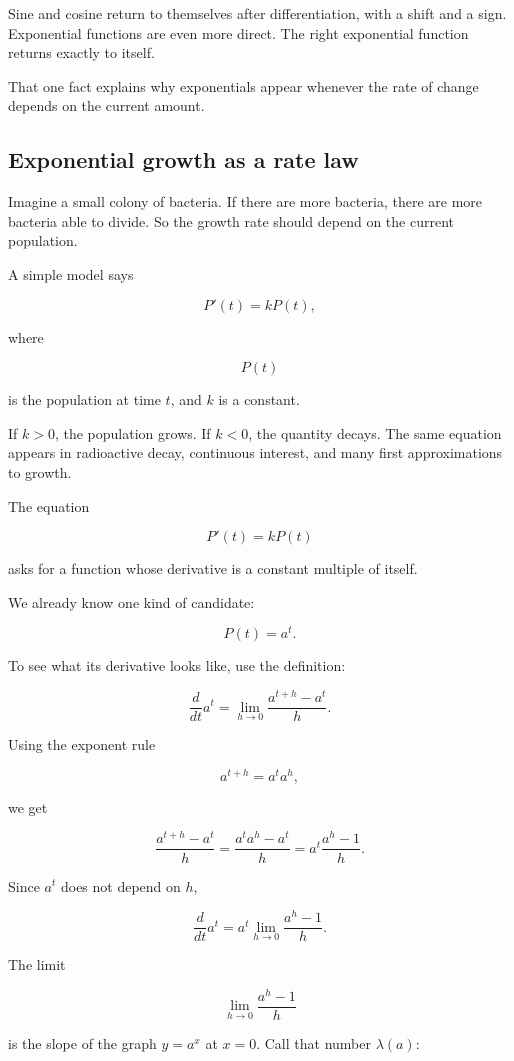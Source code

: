 Sine and cosine return to themselves after differentiation, with a shift and a sign.  Exponential functions are even more direct.  The right exponential function returns exactly to itself.

That one fact explains why exponentials appear whenever the rate of change depends on the current amount.

\subsection{Exponential growth as a rate law}
\label{subsec:exponential-growth-rate-law}

Imagine a small colony of bacteria.  If there are more bacteria, there are more bacteria able to divide.  So the growth rate should depend on the current population.

A simple model says

\[
P'(t)=kP(t),
\]

where

\[
P(t)
\]

is the population at time \(t\), and \(k\) is a constant.

If \(k>0\), the population grows.  If \(k<0\), the quantity decays.  The same equation appears in radioactive decay, continuous interest, and many first approximations to growth.

The equation

\[
P'(t)=kP(t)
\]

asks for a function whose derivative is a constant multiple of itself.

We already know one kind of candidate:

\[
P(t)=a^t.
\]

To see what its derivative looks like, use the definition:

\[
\frac{d}{dt}a^t
=
\lim_{h\to0}\frac{a^{t+h}-a^t}{h}.
\]

Using the exponent rule

\[
a^{t+h}=a^t a^h,
\]

we get

\[
\frac{a^{t+h}-a^t}{h}
=
\frac{a^t a^h-a^t}{h}
=
a^t\frac{a^h-1}{h}.
\]

Since \(a^t\) does not depend on \(h\),

\[
\frac{d}{dt}a^t
=
a^t\lim_{h\to0}\frac{a^h-1}{h}.
\]

The limit

\[
\lim_{h\to0}\frac{a^h-1}{h}
\]

is the slope of the graph \(y=a^x\) at \(x=0\).  Call that number \(\lambda(a)\):

